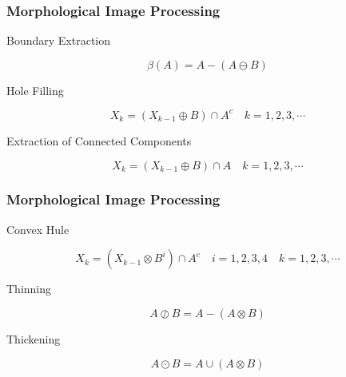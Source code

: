 \documentclass{beamer}
\begin{document}
\begin{frame}
\frametitle{Morphological Image Processing}
\begin{block}{Boundary Extraction}\scriptsize
  \begin{center}
    $$\beta(A) = A - (A \ominus B)$$
  \end{center}
\end{block}
\begin{block}{Hole Filling}\scriptsize
  \begin{center}
    $$X_k = (X_{k-1} \oplus B) \cap A^c \quad k = 1,2,3, \cdots$$
  \end{center}
\end{block}
\begin{block}{Extraction of Connected Components}\scriptsize
  \begin{center}
    $$X_k = (X_{k-1} \oplus B) \cap A \quad k = 1,2,3, \cdots$$
  \end{center}
\end{block}
\end{frame}

\begin{frame}
\frametitle{Morphological Image Processing}
\begin{block}{Convex Hule}\scriptsize
  \begin{center}
    $$X_k = (X_{k-1} \otimes B^i) \cap A^c \quad i = 1,2,3,4 \quad k = 1,2,3, \cdots$$
  \end{center}
\end{block}
\begin{block}{Thinning}\scriptsize
  \begin{center}
    $$A \oslash B = A - (A \otimes B)$$
  \end{center}
\end{block}
\begin{block}{Thickening}\scriptsize
  \begin{center}
    $$A \odot B = A \cup (A \otimes B)$$
  \end{center}
\end{block}
\end{frame}
\end{document}
